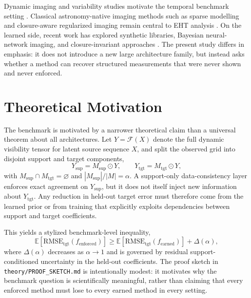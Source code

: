 \documentclass[fleqn,usenatbib]{mnras}
\begin{document}
Dynamic imaging and variability studies motivate the temporal benchmark setting \citep{Farah2022SelectiveDynamicalImaging,Satapathy2022M87Variability,Georgiev2022UniversalPowerLaw}. Classical astronomy-native imaging methods such as sparse modelling and closure-aware regularized imaging remain central to EHT analysis \citep{Akiyama2017SparseM87,Chael2018ClosureImaging,EHT2019M87IV}. On the learned side, recent work has explored synthetic libraries, Bayesian neural-network imaging, and closure-invariant approaches \citep{Janssen2025DLI,Janssen2025DLII,Janssen2025DLIII,Lai2025ClosureInvariants}. The present study differs in emphasis: it does not introduce a new large architecture family, but instead asks whether a method can recover structured measurements that were never shown and never enforced.

\section{Theoretical Motivation}

The benchmark is motivated by a narrower theoretical claim than a universal theorem about all architectures. Let \(Y=\mathcal{F}(X)\) denote the full dynamic visibility tensor for latent source sequence \(X\), and split the observed grid into disjoint support and target components,
\[
Y_{\mathrm{sup}} = M_{\mathrm{sup}}\odot Y, \qquad
Y_{\mathrm{tgt}} = M_{\mathrm{tgt}}\odot Y,
\]
with \(M_{\mathrm{sup}}\cap M_{\mathrm{tgt}}=\varnothing\) and \(|M_{\mathrm{sup}}|/|M|=\alpha\). A support-only data-consistency layer enforces exact agreement on \(Y_{\mathrm{sup}}\), but it does not itself inject new information about \(Y_{\mathrm{tgt}}\). Any reduction in held-out target error must therefore come from the learned prior or from training that explicitly exploits dependencies between support and target coefficients.

This yields a stylized benchmark-level inequality,
\[
\mathbb{E}\!\left[\mathrm{RMSE}_{\mathrm{tgt}}(f_{\mathrm{enforced}})\right]
\ge
\mathbb{E}\!\left[\mathrm{RMSE}_{\mathrm{tgt}}(f_{\mathrm{earned}})\right] + \Delta(\alpha),
\]
where \(\Delta(\alpha)\) decreases as \(\alpha \rightarrow 1\) and is governed by residual support-conditioned uncertainty in the held-out coefficients. The proof sketch in \texttt{theory/PROOF\_SKETCH.md} is intentionally modest: it motivates why the benchmark question is scientifically meaningful, rather than claiming that every enforced method must lose to every earned method in every setting.
\end{document}
